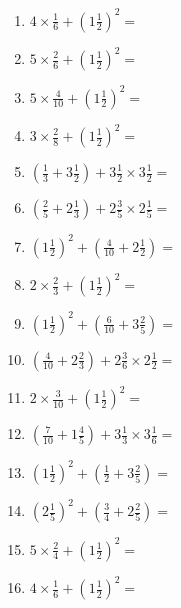 \documentclass[12pt]{article}
\begin{document}
\begin{enumerate}
\item \large $ 4 \times \frac{1}{6} + (1 \frac{1}{2})^2 = $ \vspace{1.8cm}
\item \large $ 5 \times \frac{2}{6} + (1 \frac{1}{2})^2 = $ \vspace{1.8cm}
\item \large $ 5 \times \frac{4}{10} + (1 \frac{1}{2})^2 = $ \vspace{1.8cm}
\item \large $ 3 \times \frac{2}{8} + (1 \frac{1}{2})^2 = $ \vspace{1.8cm}
\item \large $ (\frac{1}{3} + 3 \frac{1}{2}) + 3 \frac{1}{2} \times 3 \frac{1}{2} = $ \vspace{1.8cm}
\item \large $ (\frac{2}{5} + 2 \frac{1}{3}) + 2 \frac{3}{5} \times 2 \frac{1}{5} = $ \vspace{1.8cm}
\item \large $ (1 \frac{1}{2})^2 + (\frac{4}{10} + 2 \frac{1}{2}) = $ \vspace{1.8cm}
\item \large $ 2 \times \frac{2}{3} + (1 \frac{1}{2})^2 = $ \vspace{1.8cm}
\item \large $ (1 \frac{1}{2})^2 + (\frac{6}{10} + 3 \frac{2}{5}) = $ \vspace{1.8cm}
\item \large $ (\frac{4}{10} + 2 \frac{2}{3}) + 2 \frac{3}{6} \times 2 \frac{1}{2} = $ \vspace{1.8cm}
\newpage
\item \large $ 2 \times \frac{3}{10} + (1 \frac{1}{2})^2 = $ \vspace{1.8cm}
\item \large $ (\frac{7}{10} + 1 \frac{4}{5}) + 3 \frac{1}{3} \times 3 \frac{1}{6} = $ \vspace{1.8cm}
\item \large $ (1 \frac{1}{2})^2 + (\frac{1}{2} + 3 \frac{2}{5}) = $ \vspace{1.8cm}
\item \large $ (2 \frac{1}{5})^2 + (\frac{3}{4} + 2 \frac{2}{5}) = $ \vspace{1.8cm}
\item \large $ 5 \times \frac{2}{4} + (1 \frac{1}{2})^2 = $ \vspace{1.8cm}
\item \large $ 4 \times \frac{1}{6} + (1 \frac{1}{2})^2 = $ \vspace{1.8cm}

\end{enumerate}
\end{document}
